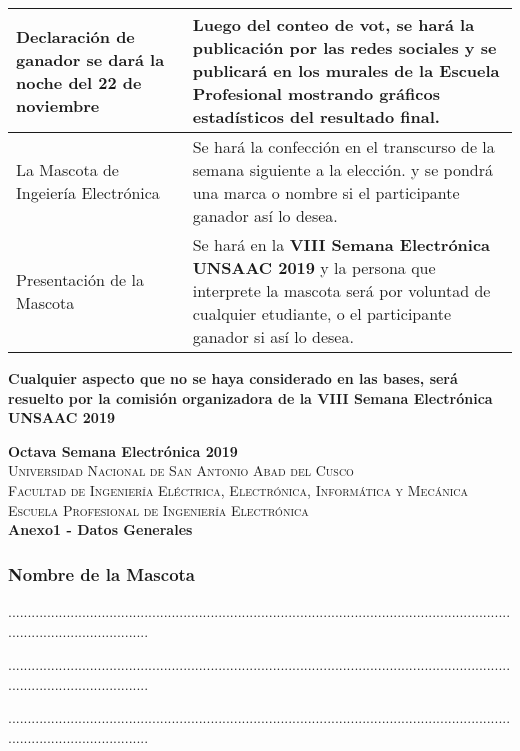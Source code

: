 \documentclass{article}
\begin{document}
\begin{tabular}{|p{8cm}|p{8cm}|}
Declaración de ganador se dará la noche del \textbf{22 de noviembre}
& Luego del conteo de vot, se hará la publicación por las redes sociales y se publicará en los murales de la Escuela Profesional mostrando gráficos estadísticos del resultado final.\\ \hline

La Mascota de Ingeiería Electrónica & 
Se hará la confección en el transcurso de la semana siguiente a la elección. y se pondrá una marca o nombre si el participante ganador así lo desea.\\ \hline

Presentación de la Mascota & 
Se hará en la \textbf{VIII Semana Electrónica UNSAAC 2019} y la persona que interprete la mascota será por voluntad de cualquier etudiante, o el participante ganador si así lo desea. \\ \hline

\end{tabular}

\textbf{Cualquier aspecto que no se haya considerado en las bases, será resuelto por la comisión 
organizadora de la VIII Semana Electrónica UNSAAC 2019}

\newpage
{\center
{\Huge \bfseries Octava Semana Electrónica 2019} \\ [0.4cm]
\textsc{\LARGE  Universidad Nacional de San Antonio Abad del Cusco}\\[0.4cm] 
\textsc{\Large Facultad de Ingeniería Eléctrica, Electrónica, Informática y Mecánica}\\[0.4cm] 
\textsc{\large Escuela Profesional de Ingeniería Electrónica}\\[0.4cm]
{ \bfseries Anexo1 - Datos Generales}}

\subsubsection{Nombre de la Mascota}

.....................................................................................................................................................................

.....................................................................................................................................................................

.....................................................................................................................................................................
\end{document}

